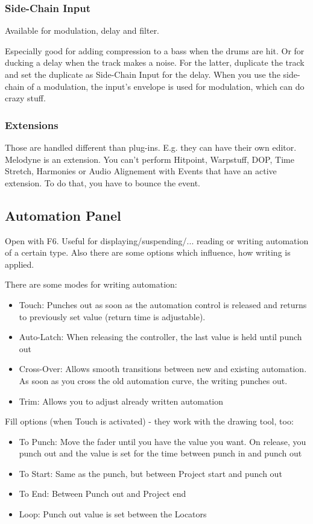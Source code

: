 \documentclass[10pt]{article}
\begin{document}
\subsubsection{Side-Chain Input}

Available for modulation, delay and filter.

Especially good for adding compression to a bass when the drums are hit. Or for ducking a delay when the track makes a noise. For the latter, duplicate the track and set the duplicate as Side-Chain Input for the delay. When you use the side-chain of a modulation, the input's envelope is used for modulation, which can do crazy stuff.

\subsubsection{Extensions}

Those are handled different than plug-ins. E.g. they can have their own editor. Melodyne is an extension. You can't perform Hitpoint, Warpstuff, DOP, Time Stretch, Harmonies or Audio Alignement with Events that have an active extension. To do that, you have to bounce the event.

\subsection{Automation Panel}

Open with F6. Useful for displaying/suspending/... reading or writing automation of a certain type. Also there are some options which influence, how writing is applied.

There are some modes for writing automation:
\begin{itemize}
	\item Touch: Punches out as soon as the automation control is released and returns to previously set value (return time is adjustable).
	\item Auto-Latch: When releasing the controller, the last value is held until punch out
	\item Cross-Over: Allows smooth transitions between new and existing automation. As soon as you cross the old automation curve, the writing punches out.
	\item Trim: Allows you to adjust already written automation
\end{itemize}

Fill options (when Touch is activated) - they work with the drawing tool, too:
\begin{itemize}
	\item To Punch: Move the fader until you have the value you want. On release, you punch out and the value is set for the time between punch in and punch out
	\item To Start: Same as the punch, but between Project start and punch out
	\item To End: Between Punch out and Project end
	\item Loop: Punch out value is set between the Locators
\end{itemize}
\end{document}
